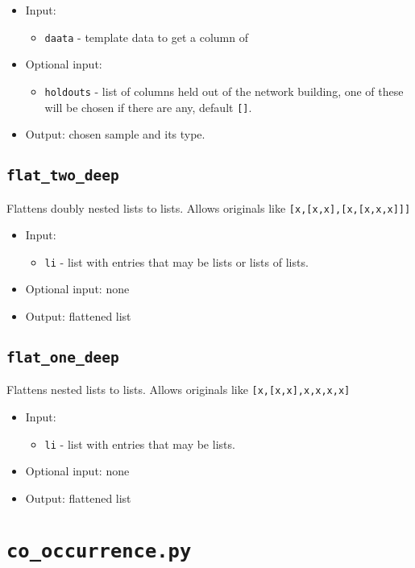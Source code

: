 \documentclass[10pt]{article}
\theoremstyle{definition}
\numberwithin{theorem}{section}
\numberwithin{definition}{section}
\numberwithin{lemma}{section}
\numberwithin{corollary}{section}
\numberwithin{clm}{section}
\numberwithin{rmk}{section}
\begin{document}
\begin{itemize}
	\item Input: 
	\begin{itemize}
		\item \verb|daata|  - template data to get a column of
	\end{itemize}
	\item Optional input:
	\begin{itemize}
		\item \verb|holdouts| - list of columns held out of the network building, one of these will be chosen if there are any, default \verb|[]|.
	\end{itemize}
	\item Output: chosen sample and its type. 
\end{itemize}


\cprotect \subsection{\verb|flat_two_deep|}
Flattens doubly nested lists to lists. Allows originals like \verb|[x,[x,x],[x,[x,x,x]]]|

\begin{itemize}
	\item Input: 
	\begin{itemize}
		\item \verb|li| - list with entries that may be lists or lists of lists.
	\end{itemize}
	\item Optional input: none
	\item Output: flattened list
\end{itemize}

\cprotect \subsection{\verb|flat_one_deep|}
Flattens nested lists to lists. Allows originals like \verb|[x,[x,x],x,x,x,x]|
\begin{itemize}
	\item Input: 
	\begin{itemize}
		\item \verb|li| - list with entries that may be lists.
	\end{itemize}
	\item Optional input: none
	\item Output: flattened list
\end{itemize}

\cprotect \section{\verb|co_occurrence.py|}
\end{document}
